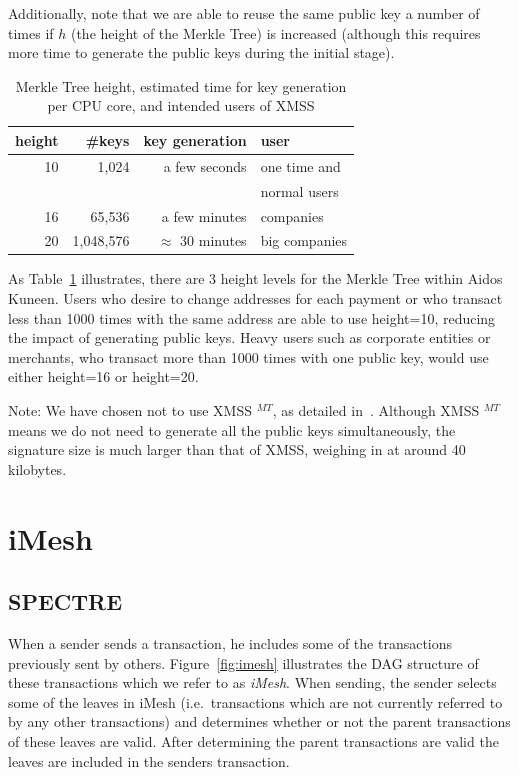 \documentclass[a4paper,10pt,twocolumn]{article}
\begin{document}
Additionally, note that we are able to reuse the same public key a number of times if \(h\) (the height of the Merkle Tree) is increased (although this requires more time to generate the public keys during the initial stage).

\begin{table}[ht]
	\caption{Merkle Tree height, estimated time for key generation per CPU core, and intended users of XMSS}
    \label{tbl:height}
	\begin{tabular}{rrrl} 
		\toprule
		height  & \#keys & key generation & user \\ 
		\midrule
			  10 & 1,024 &  a few seconds & one time and\\
			  & & & normal users \\
			  16 & 65,536 & a few minutes & companies\\
			  20 & 1,048,576 & \( \approx \) 30 minutes &  big companies\\ 
			  \bottomrule
			\end{tabular}
  \end{table}

As Table~\ref{tbl:height} illustrates, there are 3 height levels for the Merkle Tree within Aidos Kuneen. Users who desire to change 
addresses for each payment or who transact less than 1000 times with the same address are able to use height=10, reducing the impact of 
generating public keys. Heavy users such as corporate entities or merchants, who transact more than 1000 times with one 
public key, would use either height=16 or height=20.

Note: We have chosen not to use XMSS \(^{MT}\), as detailed in~\cite{ietf}. Although XMSS \(^{MT}\) means we do not need to generate all the public keys simultaneously, the signature size is much larger than that of XMSS, weighing in at around 40 kilobytes.

\section{iMesh}
\label{sec:imesh}

\subsection{SPECTRE}
When a sender sends a transaction, he includes some of the transactions previously sent by others. 
Figure~\ref{fig:imesh} illustrates the DAG structure of these transactions which we refer to as \emph{iMesh}. When sending,
the sender selects some of the leaves in iMesh (i.e.\ transactions which are not currently referred to by any other transactions) and 
determines whether or not the parent transactions of these leaves are valid. After determining the parent transactions are valid the 
leaves are included in the senders transaction.
\end{document}
